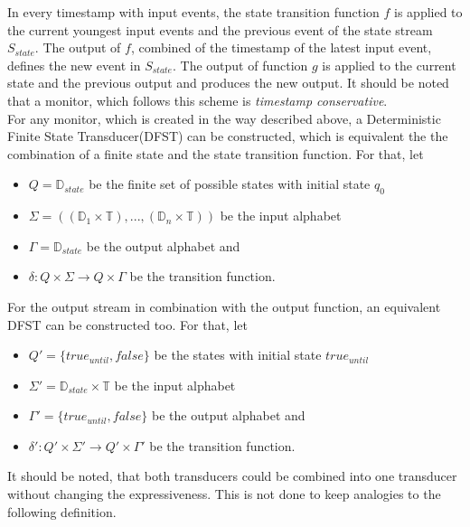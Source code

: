 		In every timestamp with input events, the state transition function $f$ is applied to the current youngest input events and the previous event of the state stream $S_{state}$. The output of $f$, combined of the timestamp of the latest input event, defines the new event in $S_{state}$. The output of function $g$ is applied to the current state and the previous output and produces the new output. It should be noted that a monitor, which follows this scheme is \textit{timestamp conservative}.\\
		For any monitor, which is created in the way described above, a Deterministic Finite State Transducer(DFST) can be constructed, which is equivalent the the combination of a finite state and the state transition function. For that, let
		\begin{itemize}
			\item
			$Q=\mathbb{D}_{state}$ be the finite set of possible states with initial state $q_0$
			\item
			$\Sigma=((\mathbb{D}_1\times \mathbb{T}),...,(\mathbb{D}_n\times \mathbb{T}))$ be the input alphabet
			\item
			$\Gamma = \mathbb D_{state}$ be the output alphabet and
			\item
			$\delta: Q\times \Sigma\rightarrow Q\times\Gamma$ be the transition function.
		\end{itemize}
		For the output stream in combination with the output function, an equivalent DFST can be constructed too. For that, let
		\begin{itemize}
			\item
				$Q' = \{true_{until}, false\}$ be the states with initial state $true_{until}$
			\item
				$\Sigma'=\mathbb D_{state}\times \mathbb{T}$ be the input alphabet
			\item
				$\Gamma' = \{true_{until}, false\}$ be the output alphabet and
			\item
				$\delta': Q'\times \Sigma'\rightarrow Q'\times\Gamma'$ be the transition function.
		\end{itemize}
		It should be noted, that both transducers could be combined into one transducer without changing the expressiveness. This is not done to keep analogies to the following definition.
